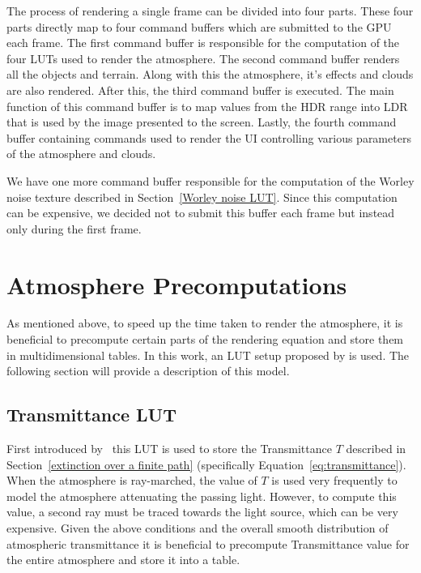 \documentclass{ctuthesis}
\begin{document}
The process of rendering a single frame can be divided into four parts. These four parts directly map to four command
buffers which are submitted to the GPU each frame. The first command buffer is responsible for the computation
of the four LUTs used to render the atmosphere. The second command buffer renders all the objects and terrain. Along with this
the atmosphere, it's effects and clouds are also rendered. After this, the third command buffer is executed. The main function of this 
command buffer is to map values from the HDR range into LDR that is used by the image presented to the screen.
Lastly, the fourth command buffer containing commands used to render the UI controlling various parameters of the atmosphere
and clouds.

We have one more command buffer responsible for the computation of the Worley noise texture described in 
Section~\ref{Worley noise LUT}. Since this computation can be expensive, we decided not to submit this
buffer each frame but instead only during the first frame.

\section{Atmosphere Precomputations}
As mentioned above, to speed up the time taken to render the atmosphere, it is beneficial
to precompute certain parts of the rendering equation and store them in multidimensional tables.
In this work, an LUT setup proposed by \cite{hillaire_2020} is used. The following section will provide a description of this model.

\subsection{Transmittance LUT}\label{transmittance computation}
First introduced by~\cite{bruneton_neyret_2008} this LUT is used to store the Transmittance $T$
described in Section~\ref{extinction over a finite path} (specifically Equation~\ref{eq:transmittance}).
When the atmosphere is ray-marched, the value of $T$ is used very frequently to model the atmosphere attenuating
the passing light. However, to compute this value, a second ray must be traced towards the light source, which
can be very expensive. Given the above conditions and the overall smooth distribution of atmospheric transmittance
it is beneficial to precompute Transmittance value for the entire atmosphere and store it into a table.
\end{document}
